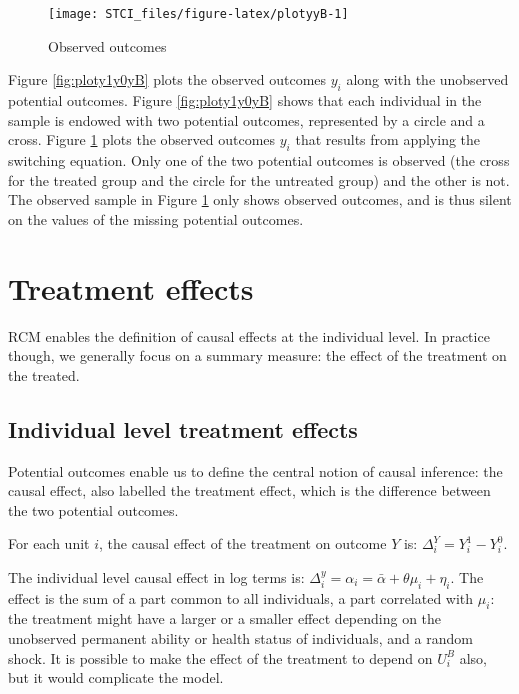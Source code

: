 \documentclass[]{book}
\theoremstyle{definition}
\theoremstyle{definition}
\theoremstyle{definition}
\theoremstyle{remark}
\let\BeginKnitrBlock\begin \let\EndKnitrBlock\end
\begin{document}
\begin{figure}

{\centering \texttt{[image: STCI\_files/figure-latex/plotyyB-1]} 

}

\caption{Observed outcomes}\label{fig:plotyyB}
\end{figure}

Figure \ref{fig:ploty1y0yB} plots the observed outcomes \(y_i\) along
with the unobserved potential outcomes. Figure \ref{fig:ploty1y0yB}
shows that each individual in the sample is endowed with two potential
outcomes, represented by a circle and a cross. Figure \ref{fig:plotyyB}
plots the observed outcomes \(y_i\) that results from applying the
switching equation. Only one of the two potential outcomes is observed
(the cross for the treated group and the circle for the untreated group)
and the other is not. The observed sample in Figure \ref{fig:plotyyB}
only shows observed outcomes, and is thus silent on the values of the
missing potential outcomes.

\section{Treatment effects}\label{treatment-effects}

RCM enables the definition of causal effects at the individual level. In
practice though, we generally focus on a summary measure: the effect of
the treatment on the treated.

\subsection{Individual level treatment
effects}\label{individual-level-treatment-effects}

Potential outcomes enable us to define the central notion of causal
inference: the causal effect, also labelled the treatment effect, which
is the difference between the two potential outcomes.

\BeginKnitrBlock{definition}[Individual level treatment effect]
\protect\hypertarget{def:causaleff}{}{\label{def:causaleff}
\iffalse (Individual level treatment effect) \fi{} }For each unit \(i\),
the causal effect of the treatment on outcome \(Y\) is:
\(\Delta^Y_i=Y_i^1-Y_i^0\).
\EndKnitrBlock{definition}

\BeginKnitrBlock{example}
\protect\hypertarget{exm:unnamed-chunk-7}{}{\label{exm:unnamed-chunk-7} }The
individual level causal effect in log terms is:
\(\Delta^y_i=\alpha_i=\bar{\alpha}+\theta\mu_i+\eta_i\). The effect is
the sum of a part common to all individuals, a part correlated with
\(\mu_i\): the treatment might have a larger or a smaller effect
depending on the unobserved permanent ability or health status of
individuals, and a random shock. It is possible to make the effect of
the treatment to depend on \(U_i^B\) also, but it would complicate the
model.
\EndKnitrBlock{example}
\end{document}
